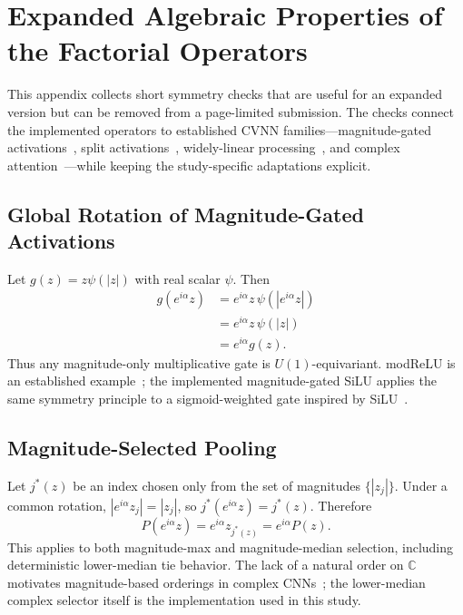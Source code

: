 \section{Expanded Algebraic Properties of the Factorial Operators}\label{app:operators}
This appendix collects short symmetry checks that are useful for an expanded version but can be removed from a page-limited submission. The checks connect the implemented operators to established CVNN families---magnitude-gated activations~\cite{Arjovsky2016Unitary,Lee2022CVNNSurvey}, split activations~\cite{Nitta1997ComplexBP,Scardapane2020ComplexActivations}, widely-linear processing~\cite{Picinbono1995WidelyLinear}, and complex attention~\cite{Eilers2023ComplexTransformer}---while keeping the study-specific adaptations explicit.

\subsection{Global Rotation of Magnitude-Gated Activations}
Let $g(z)=z\psi(|z|)$ with real scalar $\psi$. Then
\begin{align}
g(e^{i\alpha}z)
&=e^{i\alpha}z\,\psi(|e^{i\alpha}z|)\\
&=e^{i\alpha}z\,\psi(|z|)\\
&=e^{i\alpha}g(z).
\end{align}
Thus any magnitude-only multiplicative gate is $U(1)$-equivariant. modReLU is an established example~\cite{Arjovsky2016Unitary}; the implemented magnitude-gated SiLU applies the same symmetry principle to a sigmoid-weighted gate inspired by SiLU~\cite{Elfwing2018SiLU}.

\subsection{Magnitude-Selected Pooling}
Let $j^*(z)$ be an index chosen only from the set of magnitudes $\{|z_j|\}$. Under a common rotation, $|e^{i\alpha}z_j|=|z_j|$, so $j^*(e^{i\alpha}z)=j^*(z)$. Therefore
\begin{equation}
P(e^{i\alpha}z)=e^{i\alpha}z_{j^*(z)}=e^{i\alpha}P(z).
\end{equation}
This applies to both magnitude-max and magnitude-median selection, including deterministic lower-median tie behavior. The lack of a natural order on $\mathbb{C}$ motivates magnitude-based orderings in complex CNNs~\cite{Guberman2016ComplexCNN,Lee2022CVNNSurvey}; the lower-median complex selector itself is the implementation used in this study.


